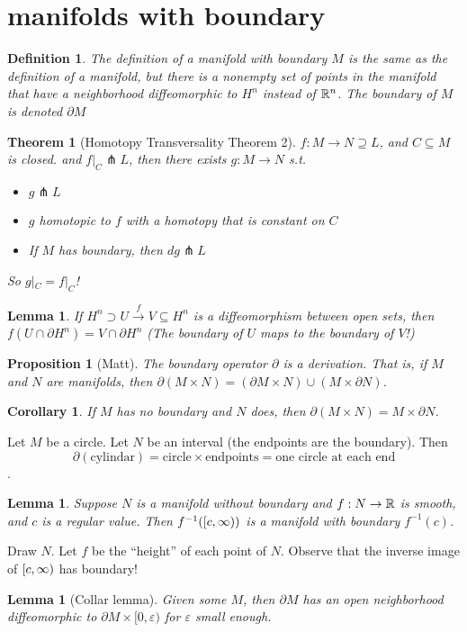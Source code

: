 \documentclass[11pt]{amsbook}
\theoremstyle{mystyle} \newtheorem{thrm}[thm]{Theorem}
\theoremstyle{mystyle} \newtheorem{defi}[thm]{Definition}
\theoremstyle{mystyle} \newtheorem{coro}[thm]{Corollary}
\theoremstyle{mystyle} \newtheorem{propo}[thm]{Proposition}
\theoremstyle{mystyle} \newtheorem{lemm}[thm]{Lemma}
\numberwithin{thm}{section}
\renewcommand{\epsilon}{\varepsilon}
\renewcommand{\d}{\partial}
\newcommand{\transverse}{\pitchfork}
\newcommand{\x}{\times}
\newcommand{\de}{\emph}
\begin{document}
\section{manifolds with boundary}
\begin{defi}
	The definition of a \de{manifold with boundary} $M$ is the same as the definition of a manifold, but there is a nonempty set of points in the manifold that have a neighborhood diffeomorphic to $H^n$ instead of ${\mathbb R}^n$.  The boundary of $M$ is denoted $\d M$
\end{defi}

\begin{thrm}[Homotopy Transversality Theorem 2]
	$f: M \to N \supseteq L$, and $C \subseteq M$ is closed.
	and $f|_C \transverse L$, then there exists
	$g: M \to N$ s.t.
	\begin{itemize}
		\item $g \transverse L$
		\item $g$ homotopic to $f$ with a homotopy that is constant on $C$
		\item If $M$ has boundary, then $dg \transverse L$
	\end{itemize}
	So $g|_C = f|_C$!
\end{thrm}
\begin{lemm}
	If $H^n \supset U \overset{f}{\to} V \subseteq H^n$ is a diffeomorphism between open sets, then $f( U \cap \d H^n ) = V \cap \d H^n$
	(The boundary of $U$ maps to the boundary of $V$!)
\end{lemm}
\begin{propo}[Matt]
	The boundary operator $\d$ is a derivation.  That is, if $M$ and $N$ are manifolds, then $\d(M \x N) = (\d M \x N) \cup (M \x \d N)$.
\end{propo}
\begin{coro}
	If $M$ has no boundary and $N$ does, then $\d(M \x N) = M \x \d N$.
\end{coro}
\begin{example}
	Let $M$ be a circle.  Let $N$ be an interval (the endpoints are the boundary).  Then $$\d(\text{cylindar}) = \text{circle} \x \text{endpoints} = \text{one circle at each end}$$.
\end{example}
\begin{lemm}
	Suppose $N$ is a manifold without boundary and $f : N \to {\mathbb R}$ is smooth, and $c$ is a regular value.  Then $f^{-1}([c,\infty))$ is a manifold with boundary $f^{-1}(c)$.
\end{lemm}
\begin{example}
	Draw $N$.  Let $f$ be the ``height'' of each point of $N$.  Observe that the inverse image of $[c, \infty)$ has boundary!
\end{example}
\begin{lemm}[Collar lemma]
	Given some $M$, then $\d M$ has an open neighborhood diffeomorphic to $\d M \x [0, \epsilon)$ for $\epsilon$ small enough.
\end{lemm}
\end{document}
